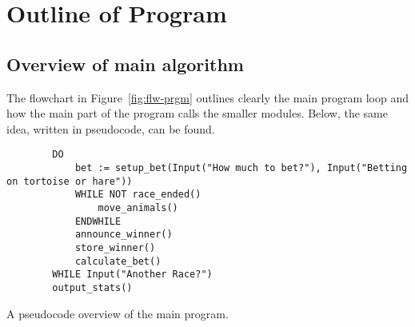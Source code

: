 \documentclass[11pt]{article}
\begin{document}
\section{Outline of Program}
\subsection{Overview of main algorithm}
The flowchart in Figure~\ref{fig:flw-prgm} outlines clearly the main program loop and how the main
part of the program calls the smaller modules. Below, the same idea, written in pseudocode, can be found.
\begin{listing}
	\begin{verbatim}
        DO
            bet := setup_bet(Input("How much to bet?"), Input("Betting on tortoise or hare"))
            WHILE NOT race_ended()
                move_animals()
            ENDWHILE
            announce_winner()
            store_winner()
            calculate_bet()
        WHILE Input("Another Race?")
        output_stats()
        \end{verbatim}
	\caption{A pseudocode overview of the main program.}
	\label{lst:psd-overview}
\end{listing}
\end{document}
